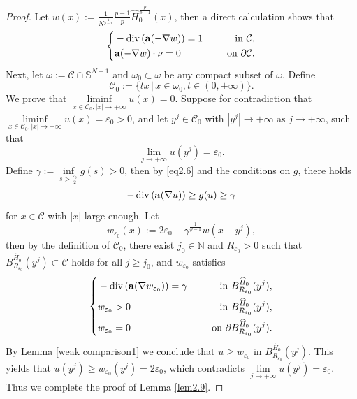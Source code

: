 \documentclass[12pt]{amsart}
\theoremstyle{definition}
\theoremstyle{remark}
\theoremstyle{conclusion}
\theoremstyle{conjecture}
\numberwithin{equation}{section}
\begin{document}
\begin{proof}
  Let $w(x):=\frac{1}{N^{\frac{1}{p-1}}}\frac{p-1}{p}\widehat{H}^{\frac{p}{p-1}}_0(x)$, then a direct calculation shows that
  \begin{equation*}
  \left\{
        \begin{aligned}
        &-\operatorname{div}\left({\bf{a}}(-\nabla w)\right)= 1 \quad\,\,\, &{\rm{in}} \,\, \mathcal{C}, \\
        &{\bf{a}}(-\nabla w)\cdot \nu =0 \quad\,\,\, &{\rm{on}} \,\, \partial\mathcal{C}.
        \end{aligned}
        \right.
 \end{equation*}
Next, let $\omega:=\mathcal{C}\cap\mathbb{S}^{N-1}$ and $\omega_0\subset\omega$ be any compact subset of $\omega$. Define
$$\mathcal{C}_0:=\{tx\,|\,x\in\omega_0,t\in(0,+\infty)\}.$$
We prove that $\liminf\limits_{x\in\mathcal{C}_0,|x|\rightarrow+\infty}u(x)=0$.
Suppose for contradiction that $\liminf\limits_{x\in\mathcal{C}_0,|x|\rightarrow+\infty}u(x)=\varepsilon_0>0$, and let $y^j\in\mathcal{C}_0$ with $|y^j|\rightarrow+\infty$ as $j\rightarrow+\infty$, such that
 $$\lim\limits_{j\rightarrow+\infty}u(y^j)=\varepsilon_0.$$
Define $\gamma:=\inf\limits_{s>\frac{\varepsilon_0}{2}}g(s)>0$, then by \eqref{eq2.6} and the conditions on $g$, there holds
$$-\operatorname{div}\left({\bf{a}}(\nabla u)\right)\geq g(u)\geq\gamma$$
for $x\in\mathcal{C}$ with $|x|$ large enough. Let
$$w_{\varepsilon_0}(x):=2\varepsilon_0-\gamma^{\frac{1}{p-1}} w(x-y^j),$$
then by the definition of $\mathcal{C}_0$, there exist $j_0\in\mathbb{N}$ and $R_{\varepsilon_0}>0$ such that $ B^{\widehat{H}_0}_{R_{\varepsilon_0}}(y^j)\subset\mathcal{C}$ holds for all $j\geq j_0$, and $w_{\varepsilon_0}$ satisfies
\begin{equation*}
  \left\{
        \begin{aligned}
        &-\operatorname{div}\left({\bf{a}}(\nabla w_{\varepsilon_0})\right)= \gamma\quad\,\,\, &{\rm{in}} \,\, B^{\widehat{H}_0}_{R_{\varepsilon_0}}(y^j), \\
        &w_{\varepsilon_0}>0\quad\,\,\, &{\rm{in}} \,\, B^{\widehat{H}_0}_{R_{\varepsilon_0}}(y^j),\\
        &w_{\varepsilon_0}=0\quad\,\,\, &{\rm{on}} \,\, \partial B^{\widehat{H}_0}_{R_{\varepsilon_0}}(y^j).
        \end{aligned}
        \right.
 \end{equation*}
 By Lemma \ref{weak comparison1} we conclude that $u\geq w_{\varepsilon_0}$ in $B^{\widehat{H}_0}_{R_{\varepsilon_0}}(y^j)$.
This yields that $u(y^j)\geq w_{\varepsilon_0}(y^j)=2\varepsilon_0$, which contradicts $\lim\limits_{j\rightarrow+\infty}u(y^j)=\varepsilon_0$. Thus we complete the proof of Lemma \ref{lem2.9}.
\end{proof}
\end{document}
